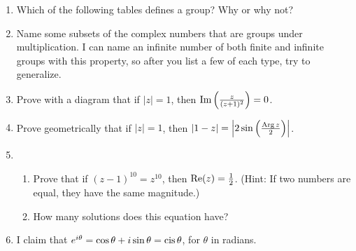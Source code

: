 \documentclass[../textbook.tex]{subfiles}
\begin{document}
\begin{enumerate}
\item Which of the following tables defines a group? Why or why not?
\begin{enumerate}
\end{enumerate}
\item Name some subsets of the complex numbers that are groups under multiplication. I can name an infinite number of both finite and infinite groups with this property, so after you list a few of each type, try to generalize.
\item Prove with a diagram that if $|z|=1$, then $\operatorname{Im}\left(\frac{z}{(z+1)^2}\right)=0$.
\item Prove geometrically that if $|z|=1$, then $|1-z|=\left|2\sin\left(\frac{\operatorname{Arg} z}{2}\right)\right|$.
\item \begin{enumerate}
\item Prove that if $(z-1)^{10}=z^{10}$, then $\operatorname{Re} (z) = \frac{1}{2}$. (Hint: If two numbers are equal, they have the same magnitude.)
\item How many solutions does this equation have?
\end{enumerate}
\item I claim that $e^{i\theta}=\cos\theta + i\sin\theta = \operatorname{cis}\theta$, for $\theta$ in radians.


\end{enumerate}
\end{document}
